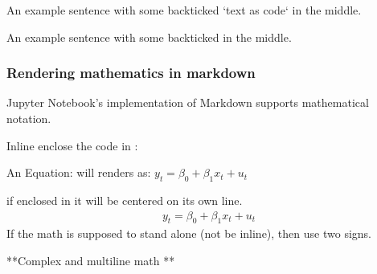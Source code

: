 \documentclass[letterpaper,10pt,english]{jupyterBook}
\begin{document}
\sphinxAtStartPar
{}

\sphinxAtStartPar
An example sentence with some back\sphinxhyphen{}ticked `text as code` in the middle.

\sphinxAtStartPar
{}

\sphinxAtStartPar
An example sentence with some back\sphinxhyphen{}ticked  in the middle.


\subsubsection{Rendering mathematics in markdown}
\label{\detokenize{content/04_PythonEssentials/Intro_Jupyter_notebook:rendering-mathematics-in-markdown}}
\sphinxAtStartPar
Jupyter Notebook’s implementation of Markdown supports  mathematical notation.

\sphinxAtStartPar
Inline enclose the  code in \sphinxcode{\sphinxupquote{\$}}:

\sphinxAtStartPar
An Equation:  will renders as: \(y_t = \beta_0 + \beta_1 x_t + u_t\)

\sphinxAtStartPar
if enclosed in \sphinxcode{\sphinxupquote{\$\$}} \sphinxcode{\sphinxupquote{\$\$}} it will be centered on its own line.
\begin{equation*}
\begin{split}y_t = \beta_0 + \beta_1 x_t + u_t\end{split}
\end{equation*}
\sphinxAtStartPar
If the math is supposed to  stand alone (not be in\sphinxhyphen{}line), then use two \sphinxcode{\sphinxupquote{\$}} signs.

\sphinxAtStartPar
**Complex and multi\sphinxhyphen{}line math **
\end{document}
